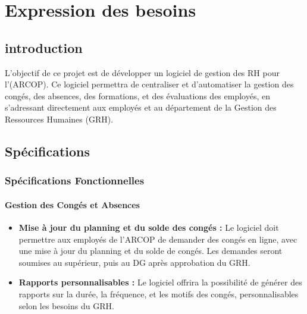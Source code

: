 \chapter{Expression des besoins}
\clearpage
\section{introduction}

L'objectif de ce projet est de développer un logiciel de gestion des \ac{RH} pour l'(\ac{ARCOP}). Ce logiciel permettra de centraliser et d'automatiser la gestion des congés, des absences, des formations, et des évaluations des employés, en s'adressant directement aux employés et au département de la Gestion des Ressources Humaines (GRH).
\section{Spécifications}
\subsection{Spécifications Fonctionnelles}


\subsubsection{Gestion des Congés et Absences}
\begin{itemize}
    \item \textbf{Mise à jour du planning et du solde des congés :} Le logiciel doit permettre aux employés de l'\ac{ARCOP} de demander des congés en ligne, avec une mise à jour du planning et du solde de congés. Les demandes seront soumises au supérieur, puis au DG après approbation du GRH.

    
    \item \textbf{Rapports personnalisables :} Le logiciel offrira la possibilité de générer des rapports sur la durée, la fréquence, et les motifs des congés, personnalisables selon les besoins du GRH.
    

    
  
\end{itemize}

